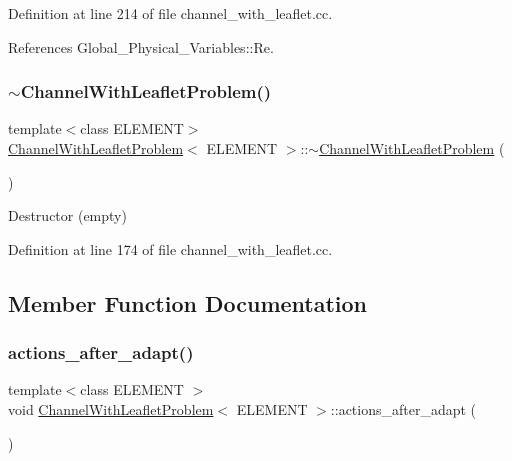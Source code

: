 Definition at line 214 of file channel\+\_\+with\+\_\+leaflet.\+cc.



References Global\+\_\+\+Physical\+\_\+\+Variables\+::\+Re.

\mbox{\label{classChannelWithLeafletProblem_a5dec8333d345e4bcaac7fcd5b463eafc}} 
\subsubsection{\texorpdfstring{$\sim$\+Channel\+With\+Leaflet\+Problem()}{~ChannelWithLeafletProblem()}}
{\footnotesize\ttfamily template$<$class E\+L\+E\+M\+E\+NT$>$ \\
\hyperlink{classChannelWithLeafletProblem}{Channel\+With\+Leaflet\+Problem}$<$ E\+L\+E\+M\+E\+NT $>$\+::$\sim$\hyperlink{classChannelWithLeafletProblem}{Channel\+With\+Leaflet\+Problem} (\begin{DoxyParamCaption}{ }\end{DoxyParamCaption})\hspace{0.3cm}{\ttfamily [inline]}}



Destructor (empty) 



Definition at line 174 of file channel\+\_\+with\+\_\+leaflet.\+cc.



\subsection{Member Function Documentation}
\mbox{\label{classChannelWithLeafletProblem_a7978755f073d950e5012951ced9e455e}} 
\subsubsection{\texorpdfstring{actions\+\_\+after\+\_\+adapt()}{actions\_after\_adapt()}}
{\footnotesize\ttfamily template$<$class E\+L\+E\+M\+E\+NT $>$ \\
void \hyperlink{classChannelWithLeafletProblem}{Channel\+With\+Leaflet\+Problem}$<$ E\+L\+E\+M\+E\+NT $>$\+::actions\+\_\+after\+\_\+adapt (\begin{DoxyParamCaption}{ }\end{DoxyParamCaption})}



